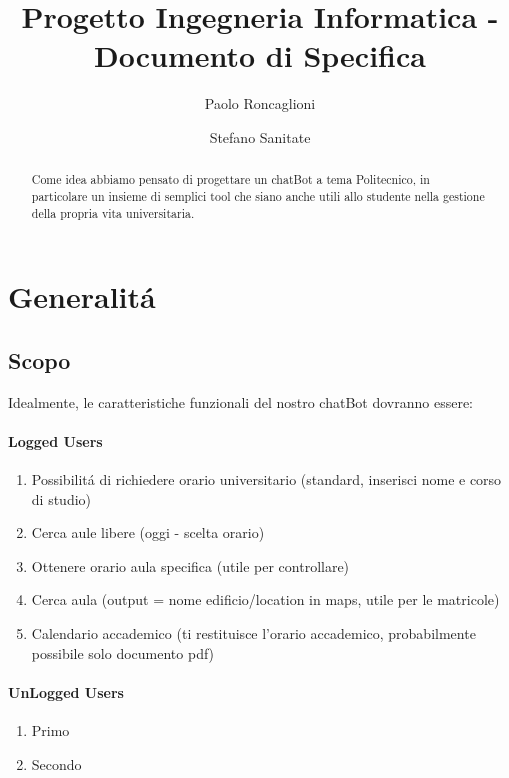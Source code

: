 \documentclass[]{article}
\begin{document}
\author{Paolo Roncaglioni \and Stefano Sanitate}
\title{Progetto Ingegneria Informatica - Documento di Specifica}
\maketitle

\begin{abstract}
Come idea abbiamo pensato di progettare un chatBot a tema Politecnico, in particolare un insieme di semplici tool che siano anche utili allo studente nella gestione della propria vita universitaria. 
\end{abstract}

\tableofcontents %

\newpage
\section{Generalitá}

\subsection{Scopo}
Idealmente, le caratteristiche funzionali del nostro chatBot dovranno essere:

\paragraph{Logged Users}
\begin{enumerate}
\item Possibilitá di richiedere orario universitario (standard, inserisci nome e corso di studio)
\item Cerca aule libere (oggi - scelta orario)
\item Ottenere orario aula specifica (utile per controllare)
\item Cerca aula (output = nome edificio/location in maps, utile per le matricole)
\item Calendario accademico (ti restituisce l’orario accademico, probabilmente possibile solo documento pdf)
\end{enumerate}

\paragraph{UnLogged Users}
\begin{enumerate}
\item Primo
\item Secondo
\end{enumerate}
\end{document}
